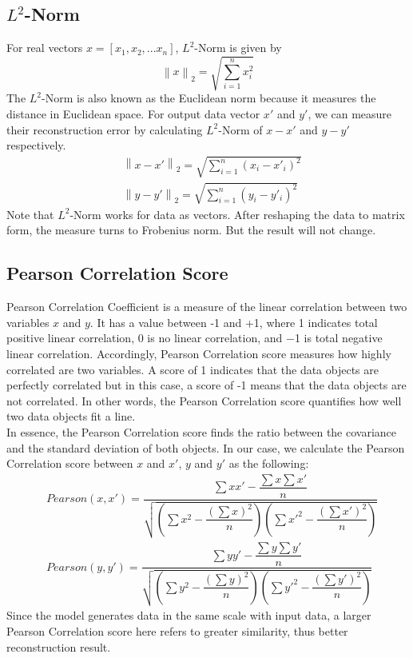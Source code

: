 \documentclass[12pt]{report} %
\newcommand{\norm}[1]{\left\lVert #1 \right\rVert}
\begin{document}
\subsection{$L^2$-Norm}
For real vectors $x=[x_1,x_2,...x_n]$, $L^2$-Norm\cite{NORM} is given by
\begin{equation}
\norm{x}_2=\sqrt{\sum _{i=1}^{n}x_i^2}
\end{equation}
The $L^2$-Norm is also known as the Euclidean norm because it measures the distance in Euclidean space. For output data vector $x'$ and $y'$, we can measure their reconstruction error by calculating $L^2$-Norm of $x-x'$ and $y-y'$ respectively.
\begin{equation}
\begin{split}
&\norm{x-x'}_2=\sqrt{\sum _{i=1}^{n}(x_i-x'_i)^2} \\
&\norm{y-y'}_2=\sqrt{\sum _{i=1}^{n}(y_i-y'_i)^2}
\end{split}
\end{equation}
Note that $L^2$-Norm works for data as vectors. After reshaping the data to matrix form, the measure turns to Frobenius norm\cite{NORM}. But the result will not change.

\subsection{Pearson Correlation Score}
Pearson Correlation Coefficient\cite{PCC, PCC2} is a measure of the linear correlation between two variables $x$ and $y$. It has a value between -1 and +1, where 1 indicates total positive linear correlation, 0 is no linear correlation, and −1 is total negative linear correlation. Accordingly, Pearson Correlation score measures how highly correlated are two variables. A score of 1 indicates that the data objects are perfectly correlated but in this case, a score of -1 means that the data objects are not correlated. In other words, the Pearson Correlation score quantifies how well two data objects fit a line. \\
In essence, the Pearson Correlation score finds the ratio between the covariance and the standard deviation of both objects. In our case, we calculate the Pearson Correlation score between $x$ and $x'$, $y$ and $y'$ as the following:
\begin{equation}
\begin{split}
&Pearson(x,x')= \dfrac{\sum xx'-\dfrac{\sum x \sum x'}{n}}{\sqrt{(\sum x^2-\dfrac{(\sum x)^2}{n})(\sum x'^2-\dfrac{(\sum x')^2}{n})}}\\
&Pearson(y,y')= \dfrac{\sum yy'-\dfrac{\sum y \sum y'}{n}}{\sqrt{(\sum y^2-\dfrac{(\sum y)^2}{n})(\sum y'^2-\dfrac{(\sum y')^2}{n})}}
\end{split}
\end{equation}
Since the model generates data in the same scale with input data, a larger Pearson Correlation score here refers to greater similarity, thus better reconstruction result.
\end{document}
